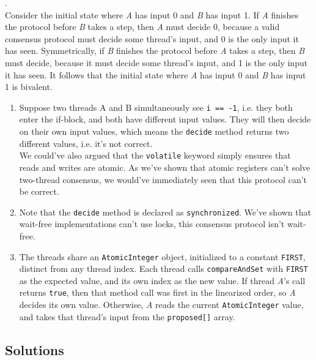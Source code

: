 \documentclass[main]{subfiles}
\begin{document}
\begin{ExerciseList}
        \Answer[ref={Cons}]. \\
            \Question Consider the initial state where \textit{A} has input 0 and \textit{B} has input 1. If \textit{A} finishes the protocol before \textit{B} takes a step, then \textit{A} must decide 0, because a valid consensus protocol must decide some thread's input, and 0 is the only input it has seen. Symmetrically, if \textit{B} finishes the protocol before \textit{A} takes a step, then \textit{B} must decide, because it must decide some thread's input, and 1 is the only input it has seen. It follows that the initial state where \textit{A} has input 0 and \textit{B} has input 1 is bivalent.
            \Question
                \begin{enumerate}[label=(\roman*)]
                    \item Suppose two threads A and B simultaneously see \texttt{i == -1}, i.e. they both enter the if-block, and both have different input values. They will then decide on their own input values, which means the \texttt{decide} method returns two different values, i.e. it's not correct. \\[3mm]
                    We could've also argued that the \texttt{volatile} keyword simply ensures that reads and writes are atomic. As we've shown that atomic registers can't solve two-thread consensus, we would've immediately seen that this protocol can't be correct.
                    \item Note that the \texttt{decide} method is declared as \texttt{synchronized}. We've shown that wait-free implementations can't use locks, this consensus protocol isn't wait-free.
                    \item The threads share an \texttt{AtomicInteger} object, initialized to a constant \texttt{FIRST}, distinct from any thread index. Each thread calls \texttt{compareAndSet} with \texttt{FIRST} as the expected value, and its own index as the new value. If thread \textit{A}'s call returns \texttt{true}, then that method call was first in the linearized order, so \textit{A} decides its own value. Otherwise, \textit{A} reads the current \texttt{AtomicInteger} value, and takes that thread's input from the \texttt{proposed[]} array.
                \end{enumerate}
    \end{ExerciseList}
\pagebreak
\subsection{Solutions}
\shipoutAnswer
\end{document}
